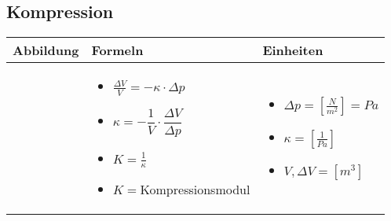 \subsection{Kompression}				%
	\begin{tabular}{ | m{6cm} | m{6cm} | m{6cm} | }
		\hline
		Abbildung & Formeln & Einheiten \\ \hline
		\hline
		\begin{minipage}{.3\textwidth}
			\tabImg[width=4.5cm]{images/Kompression}
		\end{minipage}
		&
		\begin{itemize}
			\item $\frac{\Delta V}{V}=-\kappa \cdot  \Delta p$
			\item $\kappa = -\dfrac{1}{V}\cdot \dfrac{\Delta V}{\Delta p}$
			\item {\color{red}$K=\frac{1}{\kappa}$} 
			\item {\color{red}$K=$Kompressionsmodul}
		\end{itemize}
		& 
		\begin{itemize}
			\item $\Delta p=[\frac{N}{m^2}]=Pa$
			\item $\kappa =[\frac{1}{Pa}]$
			\item $V, \Delta V =[m^3]$ 		
		\end{itemize}
		\\ \hline
	\end{tabular}


